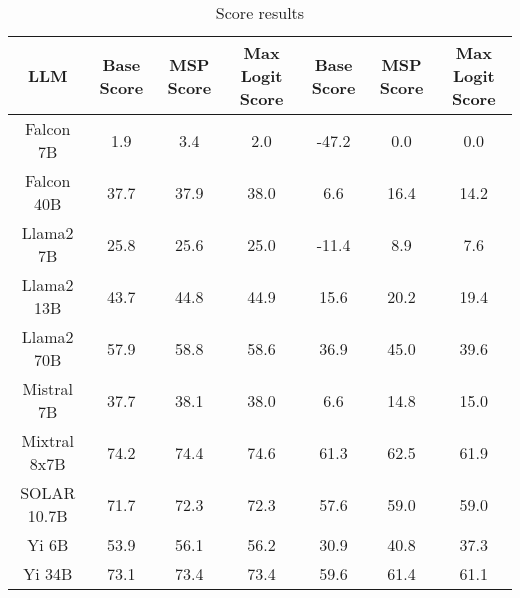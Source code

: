 \renewcommand\arraystretch{1.2}
\begin{table*}
\centering
\begin{tabular}{c|c|c|c|c|c|c}
LLM & Base Score & MSP Score & Max Logit Score & Base Score & MSP Score & Max Logit Score\\ \hline
Falcon 7B & 1.9 & 3.4 & 2.0 & -47.2 & 0.0 & 0.0\\
Falcon 40B & 37.7 & 37.9 & 38.0 & 6.6 & 16.4 & 14.2\\
Llama2 7B & 25.8 & 25.6 & 25.0 & -11.4 & 8.9 & 7.6\\
Llama2 13B & 43.7 & 44.8 & 44.9 & 15.6 & 20.2 & 19.4\\
Llama2 70B & 57.9 & 58.8 & 58.6 & 36.9 & 45.0 & 39.6\\
Mistral 7B & 37.7 & 38.1 & 38.0 & 6.6 & 14.8 & 15.0\\
Mixtral 8x7B & 74.2 & 74.4 & 74.6 & 61.3 & 62.5 & 61.9\\
SOLAR 10.7B & 71.7 & 72.3 & 72.3 & 57.6 & 59.0 & 59.0\\
Yi 6B & 53.9 & 56.1 & 56.2 & 30.9 & 40.8 & 37.3\\
Yi 34B & 73.1 & 73.4 & 73.4 & 59.6 & 61.4 & 61.1\\
\hline
\end{tabular}
\caption{Score results}
\end{table*}
\label{tab:score}
